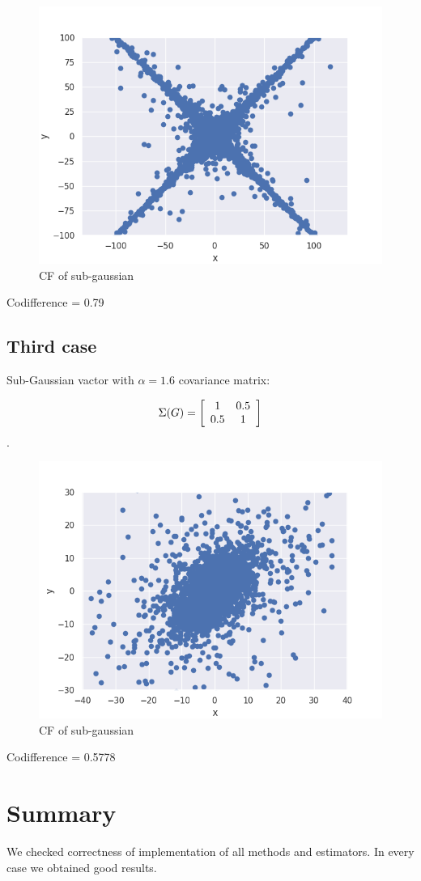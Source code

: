 \documentclass{article}
\begin{document}
	\begin{figure}[H]
		\centering
		\includegraphics[width=1\linewidth]{images/ex_5_2_alpha_stable_vector_simulation_discreet_scatter}
		\caption{CF of sub-gaussian}\label{14}
	\end{figure}
	
	Codifference = 0.79
	
	\subsection{Third case}
	Sub-Gaussian vactor with $\alpha =1.6$ covariance matrix:
	
	\[\Sigma(G) = \left[{\begin{array}{*{20}c}
			1 & 0.5\\
			0.5 & 1\end{array} } \right]\]. 

	\begin{figure}[H]
		\centering
		\includegraphics[width=1\linewidth]{images/ex_5_3_alpha_stable_vector_simulation_continuous_scatter}
		\caption{CF of sub-gaussian}\label{15}
	\end{figure}
	
	Codifference = 0.5778
	
	
	
	\section{Summary}
	We checked correctness of implementation of all methods and estimators. In every case we obtained good results.
	
\end{document}

